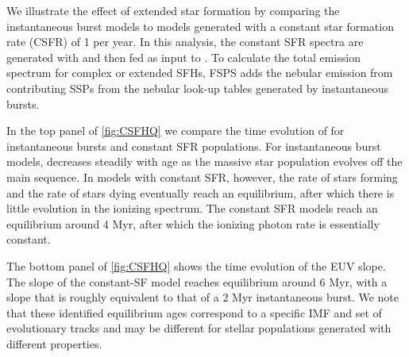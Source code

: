 We illustrate the effect of extended star formation by comparing the instantaneous burst models to models generated with a constant star formation rate (CSFR) of 1 \Msun{} per year. In this analysis, the constant SFR spectra are generated with \FSPS and then fed as input to \Cloudy. To calculate the total emission spectrum for complex or extended SFHs, FSPS adds the nebular emission from contributing SSPs from the nebular look-up tables generated by instantaneous bursts.

In the top panel of \ref{fig:CSFHQ} we compare the time evolution of \QHat{} for instantaneous bursts and constant SFR populations. For instantaneous burst models, \QHat{} decreases steadily with age as the massive star population evolves off the main sequence. In models with constant SFR, however, the rate of stars forming and the rate of stars dying eventually reach an equilibrium, after which there is little evolution in the ionizing spectrum. The constant SFR models reach an equilibrium around 4 Myr, after which the ionizing photon rate is essentially constant. 

The bottom panel of \ref{fig:CSFHQ} shows the time evolution of the EUV slope. The slope of the constant-SF model reaches equilibrium around 6 Myr, with a slope that is roughly equivalent to that of a 2 Myr instantaneous burst. We note that these identified equilibrium ages correspond to a specific IMF and set of evolutionary tracks and may be different for stellar populations generated with different properties.

